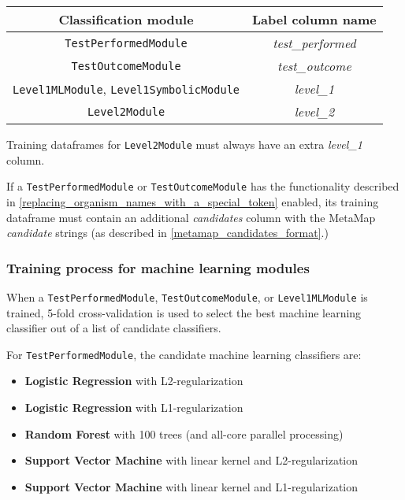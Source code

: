 \documentclass[a4paper]{article}
\begin{document}
\begin{table}[H]
\begin{tabular}{|c|c|}
\hline
Classification module & Label column name \\\hline
{\lstinline!TestPerformedModule!} & \textit{test\_performed} \\
{\lstinline!TestOutcomeModule!} & \textit{test\_outcome} \\
{\lstinline!Level1MLModule!}, {\lstinline!Level1SymbolicModule!} & \textit{level\_1} \\
{\lstinline!Level2Module!} & \textit{level\_2} \\\hline
\end{tabular}
\end{table}

Training dataframes for \lstinline{Level2Module} must always have an extra \textit{level\_1} column.

If a \lstinline{TestPerformedModule} or \lstinline{TestOutcomeModule} has the functionality described in \ref{replacing_organism_names_with_a_special_token} enabled, its training dataframe must contain an additional \textit{candidates} column with the MetaMap \textit{candidate} strings (as described in \ref{metamap_candidates_format}.)

\subsubsection{Training process for machine learning modules}

When a \lstinline{TestPerformedModule}, \lstinline{TestOutcomeModule}, or \lstinline{Level1MLModule} is trained, 5-fold cross-validation is used to select the best machine learning classifier out of a list of candidate classifiers.

For \lstinline{TestPerformedModule}, the candidate machine learning classifiers are:

\begin{itemize}
\item \textbf{Logistic Regression} with L2-regularization
\item \textbf{Logistic Regression} with L1-regularization
\item \textbf{Random Forest} with 100 trees (and all-core parallel processing)
\item \textbf{Support Vector Machine} with linear kernel and L2-regularization
\item \textbf{Support Vector Machine} with linear kernel and L1-regularization
\end{itemize}
\end{document}
